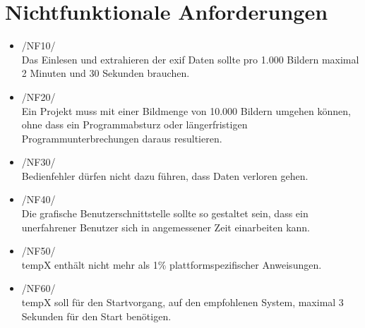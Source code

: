 \section{Nichtfunktionale Anforderungen}

\begin{itemize}
	\item /NF10/\\Das Einlesen und extrahieren der \gls{exif} Daten sollte pro 1.000 Bildern maximal 2 Minuten und 30 Sekunden brauchen.
	\item /NF20/\\Ein Projekt muss mit einer Bildmenge von 10.000 Bildern umgehen können, ohne dass ein Programmabsturz oder längerfristigen Programmunterbrechungen daraus resultieren.
	\item /NF30/\\Bedienfehler dürfen nicht dazu führen, dass Daten verloren gehen.
	\item /NF40/\\Die grafische Benutzerschnittstelle sollte so gestaltet sein, dass ein unerfahrener Benutzer sich in angemessener Zeit einarbeiten kann.
	\item /NF50/\\ \gls{tempX} enthält nicht mehr als 1\% plattformspezifischer Anweisungen.	
	\item /NF60/\\ \gls{tempX} soll für den Startvorgang, auf den empfohlenen System, maximal 3 Sekunden für den Start benötigen.
\end{itemize}